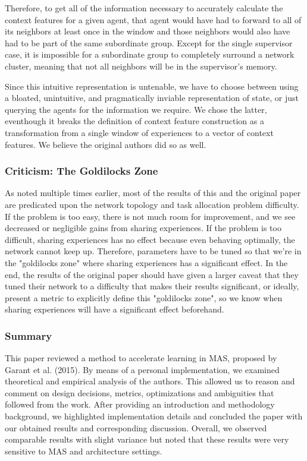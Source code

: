 \documentclass[letterpaper]{article}
\begin{document}
Therefore, to get all of the information necessary to accurately calculate the context features for a given agent, that agent would have had to forward to all of its neighbors at least once in the window and those neighbors would also have had to be part of the same subordinate group.  Except for the single supervisor case, it is impossible for a subordinate group to completely surround a network cluster, meaning that not all neighbors will be in the supervisor's memory.

Since this intuitive representation is untenable, we have to choose between using a bloated, unintuitive, and pragmatically inviable representation of state, or just querying the agents for the information we require.  We chose the latter, eventhough it breaks the definition of context feature construction as a transformation from a single window of experiences to a vector of context features.  We believe the original authors did so as well.

\subsubsection{Criticism: The Goldilocks Zone}
As noted multiple times earlier, most of the results of this and the original paper are predicated upon the network topology and task allocation problem difficulty.  If the problem is too easy, there is not much room for improvement, and we see decreased or negligible gains from sharing experiences.  If the problem is too difficult, sharing experiences has no effect because even behaving optimally, the network cannot keep up.  Therefore, parameters have to be tuned so that we're in the "goldilocks zone" where sharing experiences has a significant effect.  In the end, the results of the original paper should have given a larger caveat that they tuned their network to a difficulty that makes their results significant, or ideally, present a metric to explicitly define this "goldilocks zone", so we know when sharing experiences will have a significant effect beforehand.

\subsubsection{Summary}
This paper reviewed a method to accelerate learning in MAS, proposed by Garant et al. (2015). By means of a personal implementation, we examined theoretical and empirical analysis of the authors. This allowed us to reason and comment on design decisions, metrics, optimizations and ambiguities that followed from the work. After providing an introduction and methodology background, we highlighted implementation details and concluded the paper with our obtained results and corresponding discussion. Overall, we observed comparable results with slight variance but noted that these results were very sensitive to MAS and architecture settings.
\end{document}
